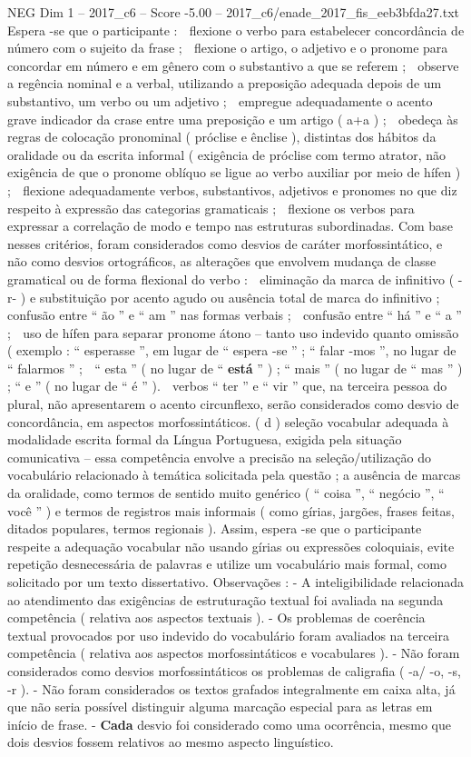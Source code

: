 \begin{textsample}{NEG Dim 1 – 2017\_c6 – Score -5.00 – 2017\_c6/enade\_2017\_fis\_eeb3bfda27.txt}
Espera -se que o participante :  flexione o verbo para estabelecer concordância de número com o sujeito da frase ;  flexione o artigo, o adjetivo e o pronome para concordar em número e em gênero com o substantivo a que se referem ;  observe a regência nominal e a verbal, utilizando a preposição adequada depois de um substantivo, um verbo ou um adjetivo ;  empregue adequadamente o acento grave indicador da crase entre uma preposição e um artigo ( a+a ) ;  obedeça às regras de colocação pronominal ( próclise e ênclise ), distintas dos hábitos da oralidade ou da escrita informal ( exigência de próclise com termo atrator, não exigência de que o pronome oblíquo se ligue ao verbo auxiliar por meio de hífen ) ;  flexione adequadamente verbos, substantivos, adjetivos e pronomes no que diz respeito à expressão das categorias gramaticais ;  flexione os verbos para expressar a correlação de modo e tempo nas estruturas subordinadas.
Com base nesses critérios, foram considerados como desvios de caráter morfossintático, e não como desvios ortográficos, as alterações que envolvem mudança de classe gramatical ou de forma flexional do verbo :  eliminação da marca de infinitivo ( -r- ) e substituição por acento agudo ou ausência total de marca do infinitivo ;  confusão entre “ ão ” e “ am ” nas formas verbais ;  confusão entre “ há ” e “ a ” ;  uso de hífen para separar pronome átono – tanto uso indevido quanto omissão ( exemplo : “ esperasse ”, em lugar de “ espera -se ” ; “ falar -mos ”, no lugar de “ falarmos ” ;  “ esta ” ( no lugar de “ \textbf{está} ” ) ; “ mais ” ( no lugar de “ mas ” ) ; “ e ” ( no lugar de “ é ” ).  verbos “ ter ” e “ vir ” que, na terceira pessoa do plural, não apresentarem o acento circunflexo, serão considerados como desvio de concordância, em aspectos morfossintáticos. ( d ) seleção vocabular adequada à modalidade escrita formal da Língua Portuguesa, exigida pela situação comunicativa – essa competência envolve a precisão na seleção/utilização do vocabulário relacionado à temática solicitada pela questão ; a ausência de marcas da oralidade, como termos de sentido muito genérico ( “ coisa ”, “ negócio ”, “ você ” ) e termos de registros mais informais ( como gírias, jargões, frases feitas, ditados populares, termos regionais ).
Assim, espera -se que o participante respeite a adequação vocabular não usando gírias ou expressões coloquiais, evite repetição desnecessária de palavras e utilize um vocabulário mais formal, como solicitado por um texto dissertativo.
Observações : - A inteligibilidade relacionada ao atendimento das exigências de estruturação textual foi avaliada na segunda competência ( relativa aos aspectos textuais ). - Os problemas de coerência textual provocados por uso indevido do vocabulário foram avaliados na terceira competência ( relativa aos aspectos morfossintáticos e vocabulares ). - Não foram considerados como desvios morfossintáticos os problemas de caligrafia ( -a/ -o, -s, -r ). - Não foram considerados os textos grafados integralmente em caixa alta, já que não seria possível distinguir alguma marcação especial para as letras em início de frase. - \textbf{Cada} desvio foi considerado como uma ocorrência, mesmo que dois desvios fossem relativos ao mesmo aspecto linguístico.

\end{textsample}

